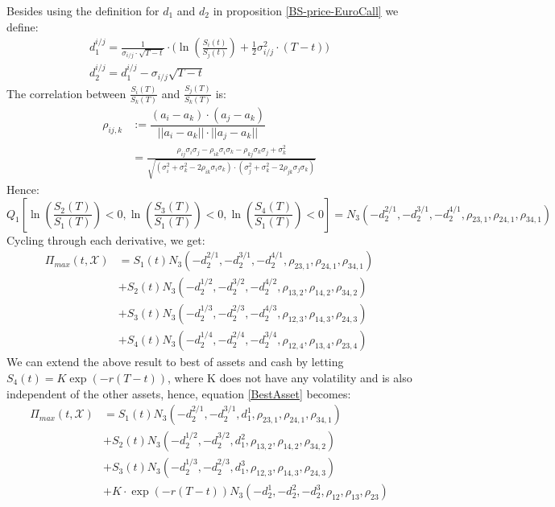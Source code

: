 Besides using the definition for $d_1$ and $d_2$ in proposition \ref{BS-price-EuroCall} we define:
\begin{align*}
d^{i/j}_1 =\frac{1}{\sigma_{i/j}\cdot \sqrt{T-t}} \cdot \bigg( \ln(\frac{S_i(t)}{S_j(t)}) + \frac{1}{2} \sigma_{i/j}^2 \cdot (T-t) \bigg)\\
d^{i/j}_2=d^{i/j}_1-\sigma_{i/j} \sqrt{T-t}
\end{align*}
The correlation between $\frac{S_i(T)}{S_k(T)}$ and $\frac{S_j(T)}{S_k(T)}$ is:
\begin{align*}
\rho_{ij,k}&:= \dfrac{(a_i-a_k)\cdot(a_j-a_k)}{||a_i-a_k|| \cdot ||a_j-a_k||}\\
&=\frac{\rho_{ij}\sigma_i \sigma_j - \rho_{ik}\sigma_i \sigma_k - \rho_{kj}\sigma_k \sigma_j + \sigma_k^2}{\sqrt{(\sigma_i^2 + \sigma_k^2 - 2\rho_{ik}\sigma_i \sigma_k)\cdot(\sigma_j^2 + \sigma_k^2 - 2\rho_{jk}\sigma_j \sigma_k)}}
\end{align*}
Hence:
$$Q_1[\ln(\frac{S_2(T)}{S_1(T)})<0, \ln(\frac{S_3(T)}{S_1(T)})<0, \ln(\frac{S_4(T)}{S_1(T)})<0]=N_3(-d_2^{2/1},-d_2^{3/1},-d_2^{4/1}, \rho_{23,1}, \rho_{24,1}, \rho_{34,1})$$
Cycling through each derivative, we get:
\begin{equation}\label{BestAsset}
\begin{split}
\Pi_{max}(t,\mathcal{X})&=S_1(t) N_3(-d_2^{2/1},-d_2^{3/1},-d_2^{4/1}, \rho_{23,1}, \rho_{24,1}, \rho_{34,1}) \\
&+S_2(t) N_3(-d_2^{1/2},-d_2^{3/2},-d_2^{4/2}, \rho_{13,2}, \rho_{14,2}, \rho_{34,2})\\
&+S_3(t) N_3(-d_2^{1/3},-d_2^{2/3},-d_2^{4/3}, \rho_{12,3}, \rho_{14,3}, \rho_{24,3}) \\
&+S_4(t) N_3(-d_2^{1/4},-d_2^{2/4},-d_2^{3/4}, \rho_{12,4}, \rho_{13,4}, \rho_{23,4})
\end{split}
\end{equation}
We can extend the above result to best of assets and cash by letting $S_4(t)=K\exp(-r(T-t))$, where K does not have any volatility and is also independent of the other assets, hence, equation \eqref{BestAsset} becomes:
\begin{equation*}\label{BestAssetOrCash}
\begin{split}
\Pi_{max}(t,\mathcal{X})&=S_1(t) N_3(-d_2^{2/1},-d_2^{3/1},d_1^{1}, \rho_{23,1}, \rho_{24,1}, \rho_{34,1}) \\
&+S_2(t) N_3(-d_2^{1/2},-d_2^{3/2},d_1^{2}, \rho_{13,2}, \rho_{14,2}, \rho_{34,2})\\
&+S_3(t) N_3(-d_2^{1/3},-d_2^{2/3},d_1^{3}, \rho_{12,3}, \rho_{14,3}, \rho_{24,3}) \\
&+K\cdot \exp(-r(T-t)) N_3(-d_2^1,-d_2^2,-d_2^3, \rho_{12}, \rho_{13}, \rho_{23})
\end{split}
\end{equation*}


